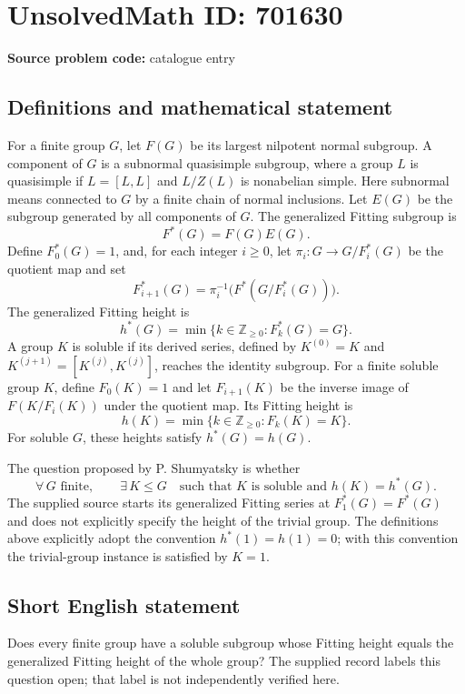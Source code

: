 \documentclass[11pt]{article}
\begin{document}
\section*{UnsolvedMath ID: 701630}
\textbf{Source problem code:} catalogue entry
\subsection{Definitions and mathematical statement}
For a finite group \(G\), let \(F(G)\) be its largest nilpotent normal subgroup. A component of \(G\) is a subnormal quasisimple subgroup, where a group \(L\) is quasisimple if \(L=[L,L]\) and \(L/Z(L)\) is nonabelian simple. Here subnormal means connected to \(G\) by a finite chain of normal inclusions. Let \(E(G)\) be the subgroup generated by all components of \(G\). The generalized Fitting subgroup is
\[
F^*(G)=F(G)E(G).
\]
Define \(F^*_0(G)=1\), and, for each integer \(i\geq 0\), let \(\pi_i:G\to G/F^*_i(G)\) be the quotient map and set
\[
F^*_{i+1}(G)=\pi_i^{-1}\bigl(F^*(G/F^*_i(G))\bigr).
\]
The generalized Fitting height is
\[
h^*(G)=\min\{k\in\mathbb Z_{\geq 0}:F^*_k(G)=G\}.
\]
A group \(K\) is soluble if its derived series, defined by \(K^{(0)}=K\) and \(K^{(j+1)}=[K^{(j)},K^{(j)}]\), reaches the identity subgroup. For a finite soluble group \(K\), define \(F_0(K)=1\) and let \(F_{i+1}(K)\) be the inverse image of \(F(K/F_i(K))\) under the quotient map. Its Fitting height is
\[
h(K)=\min\{k\in\mathbb Z_{\geq 0}:F_k(K)=K\}.
\]
For soluble \(G\), these heights satisfy \(h^*(G)=h(G)\).

The question proposed by P. Shumyatsky is whether
\[
\forall\,G\text{ finite},\qquad
\exists\,K\leq G\quad\text{such that }K\text{ is soluble and }h(K)=h^*(G).
\]
The supplied source starts its generalized Fitting series at \(F^*_1(G)=F^*(G)\) and does not explicitly specify the height of the trivial group. The definitions above explicitly adopt the convention \(h^*(1)=h(1)=0\); with this convention the trivial-group instance is satisfied by \(K=1\).
\subsection{Short English statement}
Does every finite group have a soluble subgroup whose Fitting height equals the generalized Fitting height of the whole group? The supplied record labels this question open; that label is not independently verified here.
\end{document}
